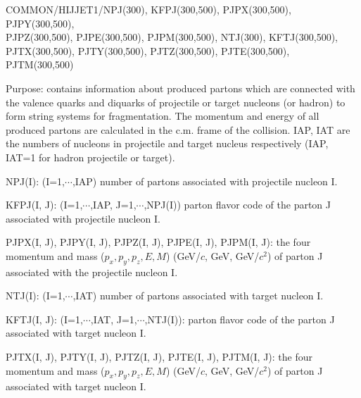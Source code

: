 \begin{description}
\itemsep=-4.0pt
\item{}COMMON/HIJJET1/NPJ(300), KFPJ(300,500), PJPX(300,500), PJPY(300,500),\\
PJPZ(300,500), PJPE(300,500), PJPM(300,500), NTJ(300), KFTJ(300,500),\\
PJTX(300,500), PJTY(300,500), PJTZ(300,500), PJTE(300,500), PJTM(300,500)
\item{}Purpose: contains information about produced partons which are 
                connected with the valence quarks and diquarks of 
                projectile or target nucleons (or hadron) to form 
                string systems for fragmentation. The momentum and
                energy of all produced partons are calculated in
                the c.m. frame of the collision. IAP, IAT are the
                numbers of nucleons in projectile and target nucleus 
                respectively (IAP, IAT=1 for hadron projectile or target).
\item{}NPJ(I): (I=1,$\cdots$,IAP) number of partons associated with projectile
                nucleon I.
\item{}KFPJ(I, J): (I=1,$\cdots$,IAP, J=1,$\cdots$,NPJ(I)) parton 
                flavor code of the 
                parton J associated with projectile nucleon I.
\item{}PJPX(I, J), PJPY(I, J), PJPZ(I, J), PJPE(I, J), PJPM(I, J): the four
                momentum and mass ($p_x,p_y,p_z,E,M$) 
                (GeV/$c$, GeV, GeV/$c^2$) of parton J associated with 
                the projectile nucleon I.
\item{}NTJ(I): (I=1,$\cdots$,IAT) number of partons associated with 
                target nucleon I.
\item{}KFTJ(I, J): (I=1,$\cdots$,IAT, J=1,$\cdots$,NTJ(I)): parton 
                flavor code of the  parton J associated with 
                target nucleon I.
\item{}PJTX(I, J), PJTY(I, J), PJTZ(I, J), PJTE(I, J), PJTM(I, J): the four
                momentum and mass ($p_x,p_y,p_z,E,M$) 
                (GeV/$c$, GeV, GeV/$c^2$) of parton J associated with
                target nucleon I.
\end{description}

